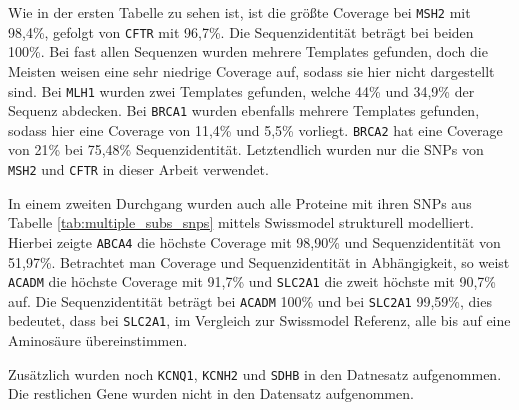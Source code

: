 Wie in der ersten Tabelle zu sehen ist, ist die größte Coverage bei \texttt{MSH2} mit 98,4\%, gefolgt von \texttt{CFTR} mit 96,7\%. Die Sequenzidentität beträgt bei beiden 100\%. Bei fast allen Sequenzen wurden mehrere Templates gefunden, doch die Meisten weisen eine sehr niedrige Coverage auf, sodass sie hier nicht dargestellt sind. Bei \texttt{MLH1} wurden zwei Templates gefunden, welche 44\% und 34,9\% der Sequenz abdecken. Bei \texttt{BRCA1} wurden ebenfalls mehrere Templates gefunden, sodass hier eine Coverage von 11,4\% und 5,5\% vorliegt. \texttt{BRCA2} hat eine Coverage von 21\% bei 75,48\% Sequenzidentität. Letztendlich wurden nur die \ac{SNP}s von \texttt{MSH2} und \texttt{CFTR} in dieser Arbeit verwendet.

In einem zweiten Durchgang wurden auch alle Proteine mit ihren SNPs aus Tabelle \ref{tab:multiple_subs_snps} mittels Swissmodel strukturell modelliert. Hierbei zeigte \texttt{ABCA4} die höchste Coverage mit 98,90\% und Sequenzidentität von 51,97\%. Betrachtet man Coverage und Sequenzidentität in Abhängigkeit, so weist \texttt{ACADM} die höchste Coverage mit 91,7\% und \texttt{SLC2A1} die zweit höchste mit 90,7\% auf. Die Sequenzidentität beträgt bei \texttt{ACADM} 100\% und bei \texttt{SLC2A1} 99,59\%, dies bedeutet, dass bei \texttt{SLC2A1}, im Vergleich zur Swissmodel Referenz, alle bis auf eine Aminosäure übereinstimmen.

Zusätzlich wurden noch \texttt{KCNQ1}, \texttt{KCNH2} und \texttt{SDHB} in den Datnesatz aufgenommen. Die restlichen Gene wurden nicht in den Datensatz aufgenommen.

